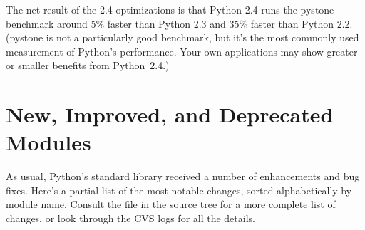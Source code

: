 \documentclass{howto}
\begin{document}
       
The net result of the 2.4 optimizations is that Python 2.4 runs the
pystone benchmark around 5\% faster than Python 2.3 and 35\% faster
than Python 2.2.  (pystone is not a particularly good benchmark, but
it's the most commonly used measurement of Python's performance.  Your
own applications may show greater or smaller benefits from Python~2.4.)


\section{New, Improved, and Deprecated Modules}

As usual, Python's standard library received a number of enhancements and
bug fixes.  Here's a partial list of the most notable changes, sorted
alphabetically by module name. Consult the
 file in the source tree for a more
complete list of changes, or look through the CVS logs for all the
details.
\end{document}
